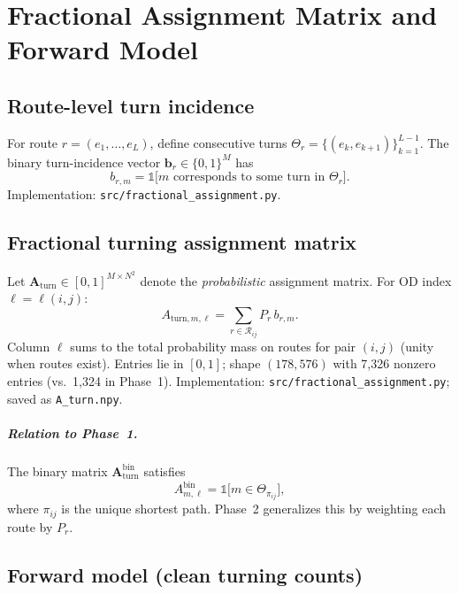 \documentclass[11pt,a4paper]{report}
\newcommand{\Aturn}{\mathbf{A}_{\mathrm{turn}}}
\begin{document}
\chapter{Fractional Assignment Matrix and Forward Model}
\label{ch:assignment}

\section{Route-level turn incidence}

For route $r=(e_1,\ldots,e_L)$, define consecutive turns $\Theta_r=\{(e_k,e_{k+1})\}_{k=1}^{L-1}$. The binary turn-incidence vector $\mathbf{b}_r\in\{0,1\}^M$ has
\begin{equation}
    b_{r,m} = \mathbb{1}\bigl[m \text{ corresponds to some turn in } \Theta_r\bigr].
    \label{eq:route_turn_vector}
\end{equation}
Implementation: \texttt{src/fractional\_assignment.py}.

\section{Fractional turning assignment matrix}

Let $\Aturn\in[0,1]^{M\times N^2}$ denote the \emph{probabilistic} assignment matrix. For OD index $\ell=\ell(i,j)$:
\begin{equation}
    A_{\mathrm{turn},m,\ell}
    = \sum_{r\in\mathcal{R}_{ij}} P_r\, b_{r,m}.
    \label{eq:fractional_A}
\end{equation}
Column $\ell$ sums to the total probability mass on routes for pair $(i,j)$ (unity when routes exist). Entries lie in $[0,1]$; shape $(178,576)$ with 7{,}326 nonzero entries (vs.\ 1{,}324 in Phase~1). Implementation: \texttt{src/fractional\_assignment.py}; saved as \texttt{A\_turn.npy}.

\paragraph{Relation to Phase~1.}
The binary matrix $\Aturn^{\mathrm{bin}}$ satisfies
\begin{equation}
    A^{\mathrm{bin}}_{m,\ell} = \mathbb{1}\bigl[m \in \Theta_{\pi_{ij}}\bigr],
\end{equation}
where $\pi_{ij}$ is the unique shortest path. Phase~2 generalizes this by weighting each route by $P_r$.

\section{Forward model (clean turning counts)}
\end{document}
